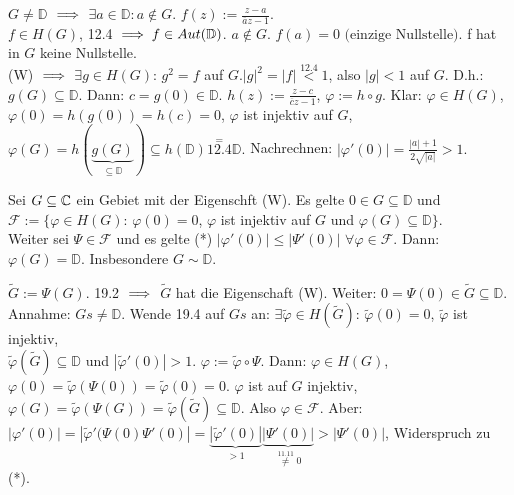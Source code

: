 \documentclass[a4paper,twoside,DIV15,BCOR12mm]{scrbook}
\def\MdD{\mathbb{D}}
\def\Gs{\ensuremath{\widetilde{G}}}
\def\phis{\ensuremath{\widetilde{\varphi}}}
\begin{document}
\begin{beweis}
   $G\ne\MdD$ $\implies$ $\exists a\in \MdD: a\not\in G$. $f(z):=\frac{z-a}{\overline{a}z-1}$.\\
   $f\in H(G)$, 12.4 $\folgt f\in Aut(\MdD)$. $a\not\in G$. $f(a)=0\text{ (einzige Nullstelle)}$. f hat in $G$ keine Nullstelle. \\ 
   (W) $\implies$ $\exists g \in H(G)$: $g^2 = f$ auf $G$.$|g|^2 = |f| \stackrel{\text{12.4}}{<} 1$, also $|g| < 1$ auf $G$. D.h.: $g(G)\subseteq\MdD$. 
   Dann: $c=g(0) \in \MdD$. $h(z):=\frac{z-c}{\overline{c}z-1}$, $\varphi:= h\circ g$. Klar: $\varphi \in H(G)$, $\varphi(0)=h(g(0))=h(c)=0$, $\varphi$ ist injektiv auf $G$, $\varphi(G) = h(\underbrace{g(G)}_{\subseteq \MdD}) \subseteq h(\MdD) \stackrel{=}{12.4} \MdD.$ Nachrechnen: $| \varphi'(0) |= \frac{|a|+1}{2\sqrt{|a|}} > 1.$
\end{beweis}


\begin{lemma}
  Sei $G\subseteq\mathbb{C}$ ein Gebiet mit der Eigenschft (W). Es gelte $0 \in G \subseteq \MdD$ und $\mathcal{F}:=\{\varphi\in H(G)$: $\varphi(0)=0$, $\varphi$ ist injektiv auf $G$ und $\varphi(G)\subseteq\MdD\}$.\\
  Weiter sei $\Psi \in \mathcal{F}$ und es gelte (*) $|\varphi'(0)|\le|\Psi'(0)|$ $\forall\varphi\in\mathcal{F}$. Dann: $\varphi(G)=\MdD$. Insbesondere $G \sim \MdD$.
\end{lemma}
\begin{beweis}
  $\Gs:=\Psi(G)$. 19.2 $\implies$ $\Gs$ hat die Eigenschaft (W). Weiter: $0=\Psi(0)\in\Gs\subseteq\MdD$. \\

  Annahme: $Gs\ne\MdD$. Wende 19.4 auf $Gs$ an: $\exists \phis\in H(\Gs)$: $\phis(0)=0$, $\phis$ ist injektiv, \\
  $\phis(\Gs)\subseteq\MdD$ und $|\phis'(0)|>1$. $\varphi:=\phis\circ\Psi$. Dann: $\varphi\in H(G)$, $\varphi(0)=\phis(\Psi(0))=\phis(0)=0$. 
  $\varphi $ ist auf $G$ injektiv, $\varphi(G)=\phis(\Psi(G))=\phis(\Gs)\subseteq\MdD$. Also $\varphi\in\mathcal{F}$. Aber: \\
  $|\varphi'(0)|=|\phis'(\Psi(0)\Psi'(0)|=\underbrace{|\phis'(0)|}_{>1} \underbrace{|\Psi'(0)|}_{\stackrel{11.11}{\ne} 0}>|\Psi'(0)|$, Widerspruch zu (*).
\end{beweis}
\end{document}
